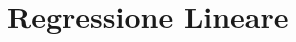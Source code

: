 \chapter{Regressione Lineare}
\begin{comment}
In molte situazioni c'è una variabile $Y$, chiamata \emph{variabili dipendente} da un insieme di valori di input, chiamati \emph{indipendenti}, $X_1, X_2, \dots, X_r$.\newline
La più semplice relazione tra la variabile dipendente $Y$ e le variabili di input $X_1, X_2, \dots, X_r$ è la relazione lineare, in cui per alcune costanti $\beta_0, \dots, \beta_r$ si ha
\[ Y = \beta_0 + \beta_1x_1 + \dots + \beta_r x_r \]
Se esite una relazione tra $Y$ e $X_i$ allora dovrebbe essere possibile predirre esattamente la risposta per ogni insieme di valori ma in pratica comunque ogni previsione non è sempre
attendibile per cui la relazione più corretta per rappresentare una relazione lineare consiste nell'equazione
\[ Y = \beta_0 + \beta_1x_1 + \dots + \beta_rx_r + e \]
dove $e$ indica l'errore, assunto con media $0$ e varianza $\sigma^2$.\newline
Un altro modo di rappresentare l'equazione precedente è la seguente
\[ E[Y | x] = \beta_0 + \beta_1x_1 + \dots + \beta_rx_r \]
dove $x = (x_1, x_2, \dots, x_r)$ è l'insieme delle variabili indipendenti e $E[Y|x]$ è la risposta attesa per l'input $x$.\newline
L'equazione presentata si chiama \emph{equazione di regressione lineare} e il vettore $(\beta_0, \beta_1, \dots, \beta_r)$ è il vettore dei coefficienti di regressione che devono 
essere stimati dall'insieme dei dati di input.\newline
In caso di $r = 1$ si ha la presenza di una \emph{regressione singola} altrimenti si ha una \emph{regressione multipla} e noi studiamo principalmente la regressione singola in quanto
è molto utile dal punto di vista didattico.\newline
Un modello di regressione singola suppone una relazione lineare tra la media e il valore della variabile indipendente singola che può essere espressa come 
\[ Y = \alpha + \beta x + e \]
dove $X$ è il valore della variabile indipendente, $e$ è l'errore commesso nella stima mentre $Y$ è la risposta data in risposta a $X$.


\end{comment}
